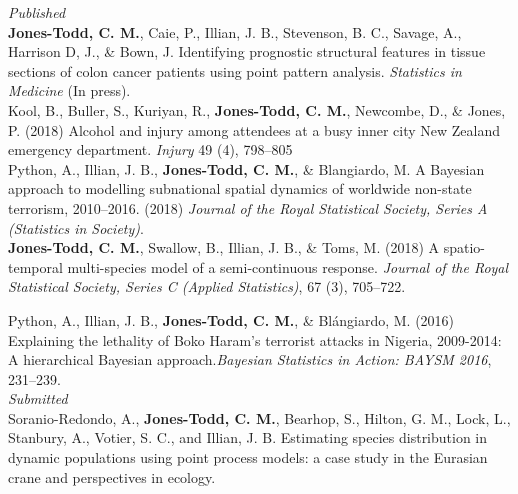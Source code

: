 \documentclass[10pt,a4paper]{moderncv}
\begin{document}
  \textit{\small{Published}}\\
  
\vspace{-3pt}
\textbf{Jones-Todd, C. M.}, Caie, P., Illian, J. B., Stevenson, B. C., Savage, A., Harrison D, J., \& Bown, J. Identifying prognostic structural features in tissue sections of colon cancer patients using point pattern analysis. \textit{Statistics in Medicine} (In press).\\


\vspace{-3pt}
Kool, B., Buller, S., Kuriyan, R., \textbf{Jones-Todd, C. M.}, Newcombe, D., \& Jones, P. (2018) Alcohol and injury among attendees at a busy inner city New Zealand emergency department. \textit{Injury} 49 (4), 798--805\\


\vspace{-3pt}
Python, A.,  Illian, J. B., \textbf{Jones-Todd, C. M.}, \& Blangiardo, M. A Bayesian approach to modelling subnational spatial dynamics of worldwide non-state terrorism, 2010--2016. (2018) \textit{Journal of the Royal Statistical Society, Series  A (Statistics in Society)}.\\

  \textbf{Jones-Todd, C. M.}, Swallow, B., Illian, J. B., \& Toms, M. (2018) A spatio-temporal multi-species model of a semi-continuous response. \textit{Journal of the Royal Statistical Society, Series C (Applied Statistics)}, 67 (3), 705--722.\\
\vspace{5pt}

\vspace{-3pt}
Python, A.,  Illian, J. B., \textbf{Jones-Todd, C. M.}, \& Bl\'{a}ngiardo, M. (2016) Explaining the lethality of Boko Haram’s terrorist attacks in Nigeria, 2009-2014: A hierarchical Bayesian approach.\textit{Bayesian Statistics in Action: BAYSM 2016}, 231--239.\\


\textit{\small{Submitted}}\\

\vspace{-3pt}
Soranio-Redondo, A., \textbf{Jones-Todd, C. M.}, Bearhop, S., Hilton, G. M., Lock, L., Stanbury, A., Votier, S. C., and Illian, J. B. Estimating species distribution in dynamic populations using point process models: a case study in the Eurasian crane and perspectives in ecology. \\
\end{document}
